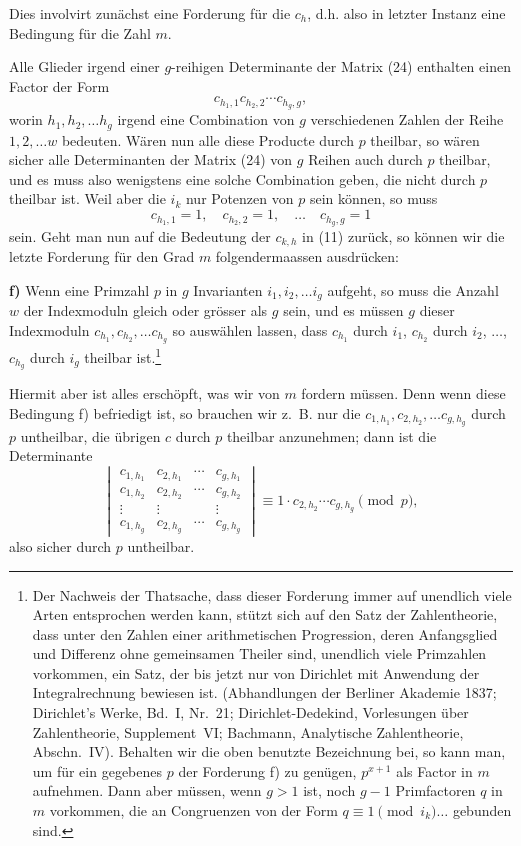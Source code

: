 \documentclass[12pt,a4paper]{article}
\theoremstyle{plain}
\theoremstyle{definition}
\theoremstyle{remark}
\begin{document}
\medskip
Dies involvirt zunächst eine Forderung für die $c_h$, d.h. also in letzter Instanz eine Bedingung für die Zahl $m$.

Alle Glieder irgend einer $g$-reihigen Determinante der Matrix (24) enthalten einen Factor der Form
\[
c_{h_1,1} c_{h_2,2} \cdots c_{h_g,g},
\]
worin $h_1, h_2, \ldots h_g$ irgend eine Combination von $g$ verschiedenen Zahlen der Reihe $1, 2, \ldots w$ bedeuten. Wären nun alle diese Producte durch $p$ theilbar, so wären sicher alle Determinanten der Matrix (24) von $g$ Reihen auch durch $p$ theilbar, und es muss also wenigstens eine solche Combination geben, die nicht durch $p$ theilbar ist. Weil aber die $i_k$ nur Potenzen von $p$ sein können, so muss
\[
c_{h_1,1} = 1, \quad c_{h_2,2} = 1, \quad \ldots \quad c_{h_g,g} = 1
\]
sein. Geht man nun auf die Bedeutung der $c_{k,h}$ in (11) zurück, so können wir die letzte Forderung für den Grad $m$ folgendermaassen ausdrücken:

\medskip\noindent\textbf{f)} Wenn eine Primzahl $p$ in $g$ Invarianten $i_1, i_2, \ldots i_g$ aufgeht, so muss die Anzahl $w$ der Indexmoduln gleich oder grösser als $g$ sein, und es müssen $g$ dieser Indexmoduln $c_{h_1}, c_{h_2}, \ldots c_{h_g}$ so auswählen lassen, dass $c_{h_1}$ durch $i_1$, $c_{h_2}$ durch $i_2$, $\ldots$, $c_{h_g}$ durch $i_g$ theilbar ist.\footnote{Der Nachweis der Thatsache, dass dieser Forderung immer auf unendlich viele Arten entsprochen werden kann, stützt sich auf den Satz der Zahlentheorie, dass unter den Zahlen einer arithmetischen Progression, deren Anfangsglied und Differenz ohne gemeinsamen Theiler sind, unendlich viele Primzahlen vorkommen, ein Satz, der bis jetzt nur von Dirichlet mit Anwendung der Integralrechnung bewiesen ist. (Abhandlungen der Berliner Akademie 1837; Dirichlet's Werke, Bd.~I, Nr.~21; Dirichlet-Dedekind, Vorlesungen über Zahlentheorie, Supplement~VI; Bachmann, Analytische Zahlentheorie, Abschn.~IV). Behalten wir die oben benutzte Bezeichnung bei, so kann man, um für ein gegebenes $p$ der Forderung f) zu genügen, $p^{x+1}$ als Factor in $m$ aufnehmen. Dann aber müssen, wenn $g > 1$ ist, noch $g-1$ Primfactoren $q$ in $m$ vorkommen, die an Congruenzen von der Form $q \equiv 1 \pmod{i_k}\ldots$ gebunden sind.}

\medskip
Hiermit aber ist alles erschöpft, was wir von $m$ fordern müssen. Denn wenn diese Bedingung f) befriedigt ist, so brauchen wir z.~B. nur die $c_{1,h_1}, c_{2,h_2}, \ldots c_{g,h_g}$ durch $p$ untheilbar, die übrigen $c$ durch $p$ theilbar anzunehmen; dann ist die Determinante
\[
\begin{vmatrix}
c_{1,h_1} & c_{2,h_1} & \cdots & c_{g,h_1} \\
c_{1,h_2} & c_{2,h_2} & \cdots & c_{g,h_2} \\
\vdots & \vdots & & \vdots \\
c_{1,h_g} & c_{2,h_g} & \cdots & c_{g,h_g}
\end{vmatrix}
\equiv 1 \cdot c_{2,h_2} \cdots c_{g,h_g} \pmod{p},
\]
also sicher durch $p$ untheilbar.
\end{document}
